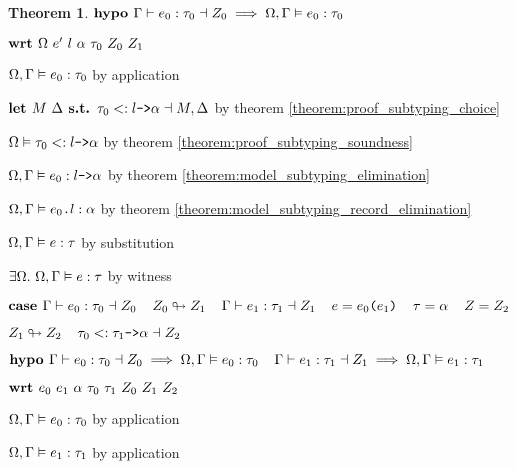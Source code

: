 \documentclass[acmsmall]{acmart}
\theoremstyle{definition}
\newtheorem{theorem}{Theorem}[section]
\begin{document}
\begin{theorem}
  \item \Z $\textbf{hypo } 
    \Gamma \vdash e_0 : \tau_0 \dashv Z_0 
    \implies 
    \Omega, \Gamma \vDash e_0 : \tau_0
  $ 
  \item \Z $\textbf{wrt } \Omega\ e' \ l \ \alpha \ \tau_0 \ Z_0 \ Z_1$ 

    \item \Z\Z $
      \Omega, \Gamma \vDash e_0 : \tau_0
    $ by application

    \item \Z\Z $
      \textbf{let }
      M\ \Delta
      \textbf{ s.t. }
      \tau_0 <: \texttt{$l$->$\alpha$} \dashv M, \Delta
    $ by theorem \ref{theorem:proof_subtyping_choice}


    \item \Z\Z $
      \Omega \vDash \tau_0  <: \texttt{$l$->$\alpha$}
    $ by theorem \ref{theorem:proof_subtyping_soundness}
    \item \Z\Z $
      \Omega, \Gamma \vDash e_0 : \texttt{$l$->$\alpha$}
    $ by theorem \ref{theorem:model_subtyping_elimination} 
    \item \Z\Z $
      \Omega, \Gamma \vDash \texttt{$e_0$.$l$} : \alpha 
    $ by theorem \ref{theorem:model_subtyping_record_elimination} 
    \item \Z\Z $
      \Omega, \Gamma \vDash e : \tau
    $ by substitution 
    \item \Z\Z $
      \exists \Omega .\ \Omega, \Gamma \vDash e : \tau
    $ by witness 


  \item \Z $\textbf{case } 
    \Gamma \vdash e_0 : \tau_0 \dashv Z_0
    \hspace{4mm}
    Z_0 \looparrowright Z_1
    \hspace{4mm}
    \Gamma \vdash e_1 : \tau_1 \dashv Z_1
    \hspace{4mm}
    e = \texttt{$e_0$($e_1$)} 
    \hspace{4mm} 
    \tau = \alpha 
    \hspace{4mm}
    Z = Z_2
  $ 
  \item \Z $ 
    Z_1 \looparrowright Z_2
    \hspace{4mm}
    \tau_0 <: \texttt{$\tau_1$->$\alpha$} \dashv Z_2
  $ 
  \item \Z $\textbf{hypo } 
    \Gamma \vdash e_0 : \tau_0 \dashv Z_0
    \implies 
    \Omega, \Gamma \vDash e_0 : \tau_0
    \hspace{4mm}
    \Gamma \vdash e_1 : \tau_1 \dashv Z_1
    \implies 
    \Omega, \Gamma \vDash e_1 : \tau_1
  $ 
  \item \Z $\B{wrt } e_0\ e_1\ \alpha\ \tau_0\ \tau_1\ Z_0\ Z_1\ Z_2 $ 
    \item \Z\Z $
      \Omega, \Gamma \vDash e_0 : \tau_0
    $ by application
    \item \Z\Z $
      \Omega, \Gamma \vDash e_1 : \tau_1
    $ by application


\end{theorem}
\end{document}
